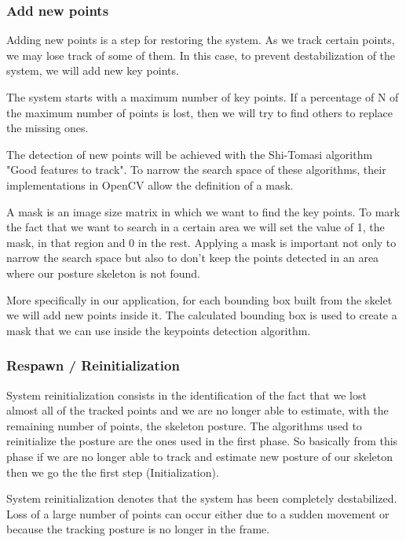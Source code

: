 \subsubsection{Add new points}
\par Adding new points is a step for restoring the system. As we track certain points, we may lose track of some of them. In this case, to prevent destabilization of the system, we will add new key points.
\par The system starts with a maximum number of key points. If a percentage of N of the maximum number of points is lost, then we will try to find others to replace the missing ones. 
\par The detection of new points will be achieved with the Shi-Tomasi algorithm "Good features to track". To narrow the search space of these algorithms, their implementations in OpenCV allow the definition of a mask. \par A mask is an image size matrix in which we want to find the key points. To mark the fact that we want to search in a certain area we will set the value of 1, the mask, in that region and 0 in the rest. Applying a mask is important not only to narrow the search space but also to don\mbox{'}t keep the points detected in an area where our posture skeleton is not found. 
\par More specifically in our application, for each bounding box built from the skelet we will add new points inside it. The calculated bounding box is used to create a mask that we can use inside the keypoints detection algorithm.
\subsubsection{Respawn / Reinitialization}
\par System reinitialization consists in the identification of the fact that we lost almost all of the tracked points and we are no longer able to estimate, with the remaining number of points, the skeleton posture. The algorithms used to reinitialize the posture are the ones used in the first phase. So basically from this phase if we are no longer able to track and estimate new posture of our skeleton then we go the the first step (Initialization).

\par System reinitialization denotes that the system has been completely destabilized. Loss of a large number of points can occur either due to a sudden movement or because the tracking posture is no longer in the frame.

